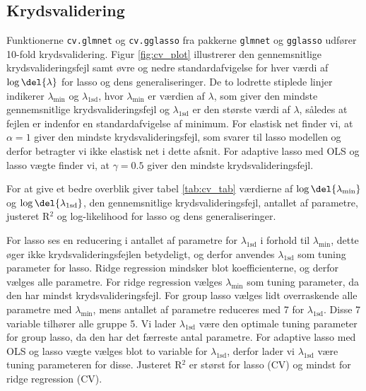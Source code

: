 \subsection{Krydsvalidering}
Funktionerne \texttt{cv.glmnet} og \texttt{cv.gglasso} fra pakkerne \texttt{glmnet} og \texttt{gglasso} udfører 10-fold krydsvalidering.
Figur \ref{fig:cv_plot} illustrerer den gennemsnitlige krydsvalideringsfejl samt øvre og nedre standardafvigelse for hver værdi af $\log \del{\lambda}$ for lasso og dens generaliseringer. 
De to lodrette stiplede linjer indikerer \(\lambda_{\text{min}}\) og \(\lambda_\text{1sd}\), hvor \(\lambda_{\text{min}}\) er værdien af \(\lambda\), som giver den mindste gennemsnitlige krydsvalideringsfejl og \(\lambda_\text{1sd}\) er den største værdi af \(\lambda\), således at fejlen er indenfor en standardafvigelse af minimum. 
For elastisk net finder vi, at $\alpha =1$ giver den mindste krydsvalideringsfejl, som svarer til lasso modellen og derfor betragter vi ikke elastisk net i dette afsnit. 
For adaptive lasso med OLS og lasso vægte finder vi, at $\gamma = 0.5$ giver den mindste krydsvalideringsfejl. 

%
For at give et bedre overblik giver tabel \ref{tab:cv_tab} værdierne af $\log \del{ \lambda_{\min}}$ og $\log \del{ \lambda_{1\text{sd}}}$, den gennemsnitlige krydsvalideringsfejl, antallet af parametre, justeret R$^2$ og log-likelihood for lasso og dens generaliseringer.


 

For lasso ses en reducering i antallet af parametre for $\lambda_{1\text{sd}}$ i forhold til $\lambda_{\min}$, dette øger ikke krydsvalideringsfejlen betydeligt, og derfor anvendes $\lambda_{1\text{sd}}$ som tuning parameter for lasso. 
Ridge regression mindsker blot koefficienterne, og derfor vælges alle parametre. 
For ridge regression vælges \(\lambda_{\min}\) som tuning parameter, da den har mindst krydsvalideringsfejl.
For group lasso vælges lidt overraskende alle parametre med \(\lambda_\text{min}\), mens antallet af parametre reduceres med 7 for $\lambda_{1\text{sd}}$. 
Disse 7 variable tilhører alle gruppe 5.
Vi lader $\lambda_{1\text{sd}}$ være den optimale tuning parameter for group lasso, da den har det færreste antal parametre.
For adaptive lasso med OLS og lasso vægte vælges blot to variable for \(\lambda_{1\text{sd}}\), derfor lader vi $\lambda_{1\text{sd}}$ være tuning parameteren for disse.  
Justeret R\(^2\) er størst for lasso (CV) og mindst for ridge regression (CV).

